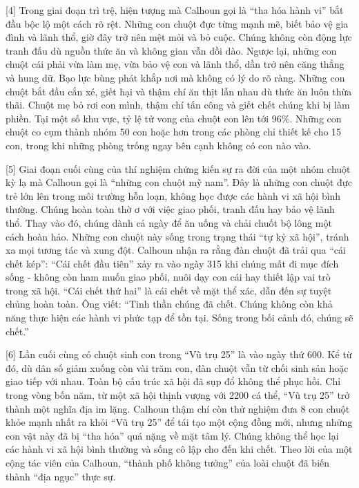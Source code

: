 \documentclass[12pt,a4paper,twoside]{article}
\newenvironment{readingpassage}[1][]{%
    \begin{tcolorbox}[enhanced, colback=grayLight, colframe=secondaryBlue,
        coltitle=textDark, fonttitle=\bfseries, title={#1},
        rounded corners, arc=3mm, boxrule=1pt,
        left=15pt, right=15pt, top=10pt, bottom=10pt,
        breakable, before skip=10pt, after skip=10pt, drop fuzzy shadow]
    \setstretch{1.3}
}{\end{tcolorbox}}
\begin{document}
\begin{readingpassage}[]
[4] Trong giai đoạn trì trệ, hiện tượng mà Calhoun gọi là ``tha hóa hành vi'' bắt đầu bộc lộ một cách rõ rệt. Những con chuột đực từng mạnh mẽ, biết bảo vệ gia đình và lãnh thổ, giờ đây trở nên mệt mỏi và bỏ cuộc. Chúng không còn động lực tranh đấu dù nguồn thức ăn và không gian vẫn dồi dào. Ngược lại, những con chuột cái phải vừa làm mẹ, vừa bảo vệ con và lãnh thổ, dần trở nên căng thẳng và hung dữ. Bạo lực bùng phát khắp nơi mà không có lý do rõ ràng. Những con chuột bắt đầu cắn xé, giết hại và thậm chí ăn thịt lẫn nhau dù thức ăn luôn thừa thãi. Chuột mẹ bỏ rơi con mình, thậm chí tấn công và giết chết chúng khi bị làm phiền. Tại một số khu vực, tỷ lệ tử vong của chuột con lên tới 96\%. Những con chuột co cụm thành nhóm 50 con hoặc hơn trong các phòng chỉ thiết kế cho 15 con, trong khi những phòng trống ngay bên cạnh không có con nào vào.

[5] Giai đoạn cuối cùng của thí nghiệm chứng kiến sự ra đời của một nhóm chuột kỳ lạ mà Calhoun gọi là ``những con chuột mỹ nam''. Đây là những con chuột đực trẻ lớn lên trong môi trường hỗn loạn, không học được các hành vi xã hội bình thường. Chúng hoàn toàn thờ ơ với việc giao phối, tranh đấu hay bảo vệ lãnh thổ. Thay vào đó, chúng dành cả ngày để ăn uống và chải chuốt bộ lông một cách hoàn hảo. Những con chuột này sống trong trạng thái ``tự kỷ xã hội'', tránh xa mọi tương tác và xung đột. Calhoun nhận ra rằng đàn chuột đã trải qua ``cái chết kép'': ``Cái chết đầu tiên'' xảy ra vào ngày 315 khi chúng mất đi mục đích sống - không còn ham muốn giao phối, nuôi dạy con cái hay thiết lập vai trò trong xã hội. ``Cái chết thứ hai'' là cái chết về mặt thể xác, dẫn đến sự tuyệt chủng hoàn toàn. Ông viết: ``Tinh thần chúng đã chết. Chúng không còn khả năng thực hiện các hành vi phức tạp để tồn tại. Sống trong bối cảnh đó, chúng sẽ chết.''

[6] Lần cuối cùng có chuột sinh con trong ``Vũ trụ 25'' là vào ngày thứ 600. Kể từ đó, dù dân số giảm xuống còn vài trăm con, đàn chuột vẫn từ chối sinh sản hoặc giao tiếp với nhau. Toàn bộ cấu trúc xã hội đã sụp đổ không thể phục hồi. Chỉ trong vòng bốn năm, từ một xã hội thịnh vượng với 2200 cá thể, ``Vũ trụ 25'' trở thành một nghĩa địa im lặng. Calhoun thậm chí còn thử nghiệm đưa 8 con chuột khỏe mạnh nhất ra khỏi ``Vũ trụ 25'' để tái tạo một cộng đồng mới, nhưng những con vật này đã bị ``tha hóa'' quá nặng về mặt tâm lý. Chúng không thể học lại các hành vi xã hội bình thường và sống cô lập cho đến khi chết. Theo lời của một cộng tác viên của Calhoun, ``thành phố không tưởng'' của loài chuột đã biến thành ``địa ngục'' thực sự.


\end{readingpassage}
\end{document}
